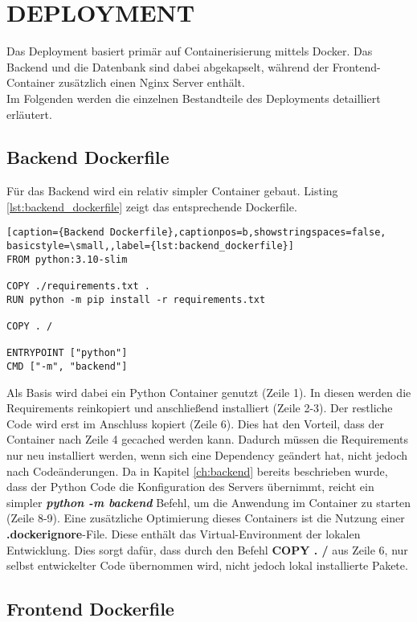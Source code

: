 \section{DEPLOYMENT}\label{ch:deployment}

Das Deployment basiert primär auf Containerisierung mittels Docker. 
Das Backend und die Datenbank sind dabei abgekapselt, während der Frontend-Container zusätzlich einen Nginx Server enthält.\\
Im Folgenden werden die einzelnen Bestandteile des Deployments detailliert erläutert.

\subsection{Backend Dockerfile}

Für das Backend wird ein relativ simpler Container gebaut. Listing \ref{lst:backend_dockerfile} zeigt das entsprechende Dockerfile.
\begin{lstlisting}[caption={Backend Dockerfile},captionpos=b,showstringspaces=false, basicstyle=\small,,label={lst:backend_dockerfile}]
FROM python:3.10-slim

COPY ./requirements.txt .
RUN python -m pip install -r requirements.txt

COPY . /

ENTRYPOINT ["python"]
CMD ["-m", "backend"]
\end{lstlisting}

Als Basis wird dabei ein Python Container genutzt (Zeile 1). 
In diesen werden die Requirements reinkopiert und anschließend installiert (Zeile 2-3).
Der restliche Code wird erst im Anschluss kopiert (Zeile 6). 
Dies hat den Vorteil, dass der Container nach Zeile 4 gecached werden kann. 
Dadurch müssen die Requirements nur neu installiert werden, wenn sich eine Dependency geändert hat, nicht jedoch nach Codeänderungen. 
Da in Kapitel \ref{ch:backend} bereits beschrieben wurde, dass der Python Code die Konfiguration des Servers übernimmt, reicht ein simpler \textbf{\textit{python -m backend}} Befehl, um die Anwendung im Container zu starten (Zeile 8-9).
Eine zusätzliche Optimierung dieses Containers ist die Nutzung einer \textbf{.dockerignore}-File. Diese enthält das Virtual-Environment der lokalen Entwicklung. Dies sorgt dafür, dass durch den Befehl \textbf{COPY . /} aus Zeile 6, nur selbst entwickelter Code übernommen wird, nicht jedoch lokal installierte Pakete.

\subsection{Frontend Dockerfile}

